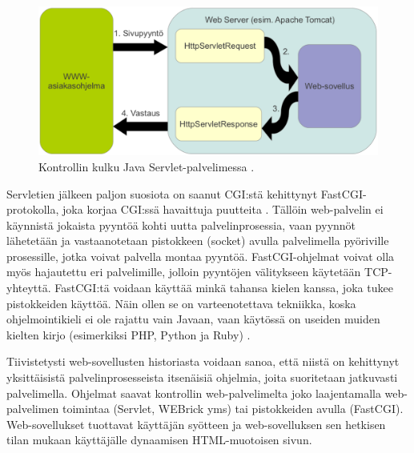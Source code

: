 \begin{figure}[ht]
\centering
\includegraphics[width=\textwidth]{web/servlet.eps}
\caption{Kontrollin kulku Java Servlet-palvelimessa \cite{j2ee}.}%
\label{servlet}
\end{figure}

Servletien jälkeen paljon suosiota on saanut CGI:stä kehittynyt FastCGI-protokolla, joka korjaa CGI:ssä havaittuja puutteita \cite{fastcgi}. Tällöin web-palvelin ei käynnistä jokaista pyyntöä kohti uutta palvelinprosessia, vaan pyynnöt lähetetään ja vastaanotetaan pistokkeen (socket) avulla palvelimella pyöriville prosessille, jotka voivat palvella montaa pyyntöä. FastCGI-ohjelmat voivat olla myös hajautettu eri palvelimille, jolloin pyyntöjen välitykseen käytetään TCP-yhteyttä. FastCGI:tä voidaan käyttää minkä tahansa kielen kanssa, joka tukee pistokkeiden käyttöä. Näin ollen se on varteenotettava tekniikka, koska ohjelmointikieli ei ole rajattu vain Javaan, vaan käytössä on useiden muiden kielten kirjo (esimerkiksi PHP, Python ja Ruby) \cite{fastcgi}.

Tiivistetysti web-sovellusten historiasta voidaan sanoa, että niistä on kehittynyt yksittäisistä palvelinprosesseista itsenäisiä ohjelmia, joita suoritetaan jatkuvasti palvelimella. Ohjelmat saavat kontrollin web-palvelimelta joko laajentamalla web-palvelimen toimintaa (Servlet, WEBrick yms) tai pistokkeiden avulla (FastCGI). Web-so\-vel\-luk\-set tuottavat käyttäjän syötteen ja web-sovelluksen sen hetkisen tilan mukaan käyttäjälle dynaamisen HTML-muotoisen sivun.